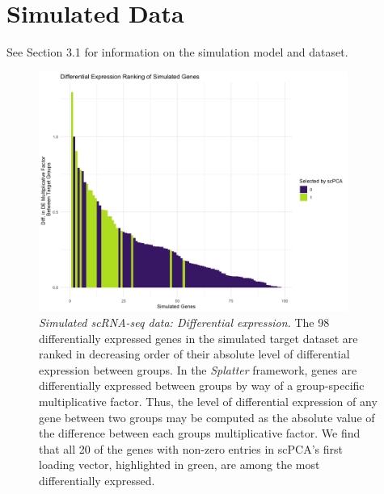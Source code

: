\documentclass{article}
\begin{document}
\FloatBarrier

\newpage

\section{Simulated Data}

See Section 3.1 %
for information on the simulation model and dataset.

\begin{figure}[!htbp]
    \centering
    \includegraphics[width=0.9\textwidth]{figures/sim_de_genes}
    \caption{{\em Simulated scRNA-seq data: Differential expression.}
    The 98 differentially expressed genes in the simulated target dataset are ranked in decreasing order of their absolute level of differential expression between groups. In the \textit{Splatter} framework, genes are differentially expressed between groups by way of a group-specific multiplicative factor. Thus, the level of differential expression of any gene between two groups may be computed as the absolute value of the difference between each groups multiplicative factor. We find that all 20 of the genes with non-zero entries in scPCA's first loading vector, highlighted in green, are among the most differentially expressed.}
    \label{fig:sim_de_genes}
\end{figure}
\end{document}
